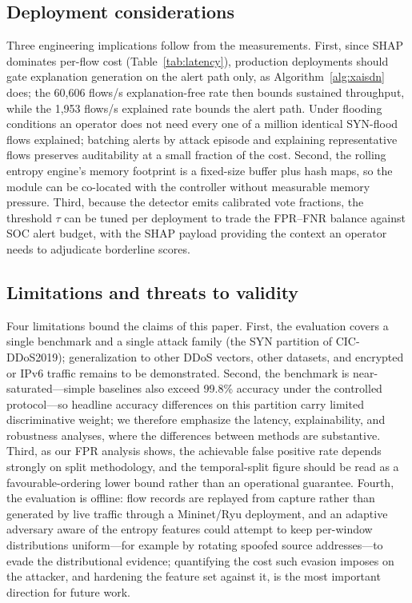 ﻿\documentclass[journal]{IEEEtran}
\begin{document}
\subsection{Deployment considerations}
Three engineering implications follow from the measurements. First, since SHAP dominates per-flow cost (Table~\ref{tab:latency}), production deployments should gate explanation generation on the alert path only, as Algorithm~\ref{alg:xaisdn} does; the 60,606 flows/s explanation-free rate then bounds sustained throughput, while the 1,953 flows/s explained rate bounds the alert path. Under flooding conditions an operator does not need every one of a million identical SYN-flood flows explained; batching alerts by attack episode and explaining representative flows preserves auditability at a small fraction of the cost. Second, the rolling entropy engine's memory footprint is a fixed-size buffer plus hash maps, so the module can be co-located with the controller without measurable memory pressure. Third, because the detector emits calibrated vote fractions, the threshold $\tau$ can be tuned per deployment to trade the FPR--FNR balance against SOC alert budget, with the SHAP payload providing the context an operator needs to adjudicate borderline scores.

\subsection{Limitations and threats to validity}
Four limitations bound the claims of this paper. First, the evaluation covers a single benchmark and a single attack family (the SYN partition of CIC-DDoS2019); generalization to other DDoS vectors, other datasets, and encrypted or IPv6 traffic remains to be demonstrated. Second, the benchmark is near-saturated---simple baselines also exceed 99.8\% accuracy under the controlled protocol---so headline accuracy differences on this partition carry limited discriminative weight; we therefore emphasize the latency, explainability, and robustness analyses, where the differences between methods are substantive. Third, as our FPR analysis shows, the achievable false positive rate depends strongly on split methodology, and the temporal-split figure should be read as a favourable-ordering lower bound rather than an operational guarantee. Fourth, the evaluation is offline: flow records are replayed from capture rather than generated by live traffic through a Mininet/Ryu deployment, and an adaptive adversary aware of the entropy features could attempt to keep per-window distributions uniform---for example by rotating spoofed source addresses---to evade the distributional evidence; quantifying the cost such evasion imposes on the attacker, and hardening the feature set against it, is the most important direction for future work.
\end{document}
